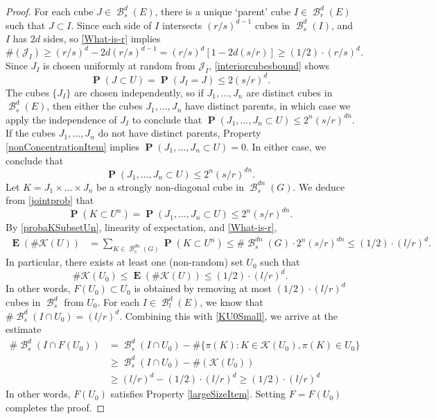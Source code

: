 \documentclass[dvipsnames,letterpaper,12pt]{article}
\numberwithin{equation}{section}
\theoremstyle{plain}
\theoremstyle{remark}
\DeclareMathOperator{\prob}{\mathbf{P}}
\DeclareMathOperator{\expect}{\mathbf{E}}
\DeclareMathOperator{\setcolon}{\colon}
\DeclareMathOperator{\B}{\mathcal{B}}
\begin{document}
\begin{proof}
	For each cube $J \in \B_s^d(E)$, there is a unique `parent' cube $I \in \B_r^d(E)$ such that $J \subset I$. Since each side of $I$ intersects $(r/s)^{d-1}$ cubes in $\B_s^d(I)$, and $I$ has $2d$ sides, so \eqref{What-is-r} implies
	\begin{equation} \label{interiorcubesbound}
		\#(\mathcal{J}_I) \geq (r/s)^d - 2d (r/s)^{d-1} = (r/s)^d[1 - 2d(s/r)] \geq (1/2) \cdot (r/s)^d.
	\end{equation}
	Since $J_I$ is chosen uniformly at random from $\mathcal{J}_I$, \eqref{interiorcubesbound} shows
	\[ \prob(J \subset U) = \prob(J_I = J) \leq 2 (s/r)^d. \]
	The cubes $\{ J_I \}$ are chosen independently, so if $J_1, \dots, J_n$ are distinct cubes in $\B^d_s(E)$, then either the cubes $J_1, \dots, J_n$ have distinct parents, in which case we apply the independence of $J_I$ to conclude that $\prob(J_1, \dots, J_n \subset U) \leq 2^n (s/r)^{dn}$. If the cubes $J_1, \dots, J_n$ do not have distinct parents, Property \ref{nonConcentrationItem} implies $\prob(J_1, \dots, J_n \subset U) = 0$. In either case, we conclude that
	\begin{equation}\label{jointprob}
	\prob(J_1, \dots, J_n \subset U) \leq 2^n (s/r)^{dn}.
	\end{equation}
	Let $K = J_1 \times \dots \times J_n$ be a strongly non-diagonal cube in $\B^{dn}_s(G)$. We deduce from \eqref{jointprob} that
	\begin{equation}\label{probaKSubsetUn}
		\prob(K \subset U^n) = \prob(J_1, \dots, J_n \subset U) \leq 2^n (s/r)^{dn}.
	\end{equation}
	By \eqref{probaKSubsetUn}, linearity of expectation, and \eqref{What-is-r},
	\begin{align*}
		\expect(\# \mathcal{K}(U)) &= \sum_{K \in \B^{dn}_s(G)} \prob(K \subset U^n) \leq \# \B_s^{dn}(G) \cdot 2^n (s/r)^{dn} \leq (1/2) \cdot (l/r)^d.
	\end{align*}
	In particular, there exists at least one (non-random) set $U_0$ such that
	\begin{equation}\label{KU0Small}
		\# \mathcal{K}(U_0) \leq \expect(\# \mathcal{K}(U)) \leq (1/2) \cdot (l/r)^d.
	\end{equation}
	In other words, $F(U_0) \subset U_0$ is obtained by removing at most $(1/2) \cdot (l/r)^d$ cubes in $\B^d_s$ from $U_0$. For each $I \in \B_l^d(E)$, we know that $\# \B_{s}^d(I \cap U_0) = (l/r)^d$. Combining this with \eqref{KU0Small}, we arrive at the estimate 
	\begin{align*}
		\# \B_s^d(I \cap F(U_0)) &= \B_s^d(I \cap U_0) - \# \{ \pi(K) \setcolon K \in \mathcal{K}(U_0), \pi(K) \in U_0 \}\\
		&\geq \B_s^d(I \cap U_0) - \#(\mathcal{K}(U_0))\\
		&\geq (l/r)^d - (1/2) \cdot (l/r)^d \geq (1/2) \cdot (l/r)^d
	\end{align*}  
	In other words, $F(U_0)$ satisfies Property \ref{largeSizeItem}. Setting $F = F(U_0)$ completes the proof.
\end{proof}
\end{document}
